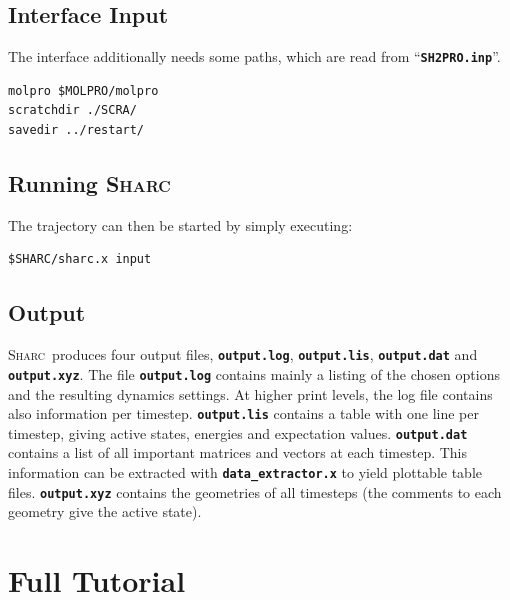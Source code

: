 \documentclass[a4paper,11pt,DIV=15,openany]{scrbook}
\newcommand{\sharc}{\textsc{Sharc}}
\newcommand{\ttt}[1]{\textbf{\texttt{#1}}}
\newenvironment{example}{
  \vspace{0mm}
  \definecolor{shadecolor}{HTML}{E4F4FF}
  \begin{shaded}
}{
  \end{shaded}
}
\begin{document}
\section{Interface Input}

The interface additionally needs some paths, which are read from ``\ttt{SH2PRO.inp}''.
\begin{example}\vspace{-8mm}
\begin{verbatim}
molpro $MOLPRO/molpro
scratchdir ./SCRA/
savedir ../restart/
\end{verbatim}\vspace{-5mm}
\end{example}

\section{Running \sharc}

The trajectory can then be started by simply executing:
\begin{example}\vspace{-8mm}
\begin{verbatim}
$SHARC/sharc.x input 
\end{verbatim}\vspace{-5mm}
\end{example}

\section{Output}

\sharc\ produces four output files, \ttt{output.log}, \ttt{output.lis}, \ttt{output.dat} and \ttt{output.xyz}. The file \ttt{output.log} contains mainly a listing of the chosen options and the resulting dynamics settings. At higher print levels, the log file contains also information per timestep. \ttt{output.lis} contains a table with one line per timestep, giving active states, energies and expectation values. \ttt{output.dat} contains a list of all important matrices and vectors at each timestep. This information can be extracted with \ttt{data\_extractor.x} to yield plottable table files. \ttt{output.xyz} contains the geometries of all timesteps (the comments to each geometry give the active state).





\chapter{Full Tutorial}\label{chap:full}
\end{document}

